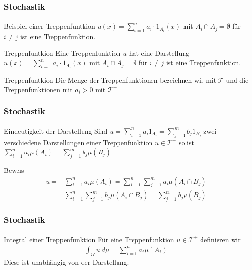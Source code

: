 \documentclass{beamer}
\begin{document}
\begin{frame}
    \frametitle{Stochastik}
\framesubtitle{}

    \begin{block}{Beispiel  einer Treppenfuntkion}
         $u(x) = \sum_{i= 1}^n a_i \cdot  1_{A_i}(x)$ mit $A_i \cap A_j = \emptyset$ für $i \neq j$ ist eine Treppenfunktion.
    \end{block}


    \begin{block}{Treppenfuntkion}
        Eine Treppenfunktion  $u$ hat eine Darstellung
        $u(x) = \sum_{i= 1}^n a_i \cdot  1_{A_i}(x)$ mit $A_i \cap A_j = \emptyset$ für $i \neq j$ ist eine Treppenfunktion.
   \end{block}


    \begin{block}{Treppenfuntkion}
        Die Menge der Treppenfunktionen bezeichnen wir mit $\mathcal{T}$ und die Treppenfunktionen mit $a_i > 0$ mit $\mathcal{T}^+$.        
    \end{block}
    


\end{frame}


\begin{frame}
    \frametitle{Stochastik}
\framesubtitle{}

    \begin{block}{Eindeutigkeit der Darstellung}
        Sind $u = \sum_{i= 1}^n a_i 1_{A_i} = \sum_{j= 1}^m b_j 1_{B_j}$ zwei verschiedene Darstellungen einer Treppenfunktion 
        $u \in \mathcal{T}^+$
        so ist $\sum_{i= 1}^n a_i \mu (A_i) = \sum_{j= 1}^m b_j \mu (B_j)$
    \end{block}
    \begin{block}{Beweis}
        \begin{align*}
         u =& \sum_{i= 1}^n a_i \mu (A_i) = \sum_{i= 1}^n \sum_{j= 1}^m a_i \mu (A_i \cap B_j) 
        \\ = & \sum_{i= 1}^n \sum_{j= 1}^m b_j \mu (A_i \cap B_j) = \sum_{j= 1}^m b_j \mu (B_j)       
    \end{align*}
       
    \end{block}    
\end{frame}



\begin{frame}
    \frametitle{Stochastik}
\framesubtitle{}
    \begin{block}{Integral einer Treppenfunktion}
        Für eine Treppenfunktion $u \in \mathcal{T}^+$ definieren wir
\begin{align*}
    \int_\Omega u \; d\mu= \sum_{i=1}^n a_i \mu(A_i)
\end{align*}
Diese ist unabhängig von der Darstellung.
    \end{block}

\end{frame}
\end{document}

